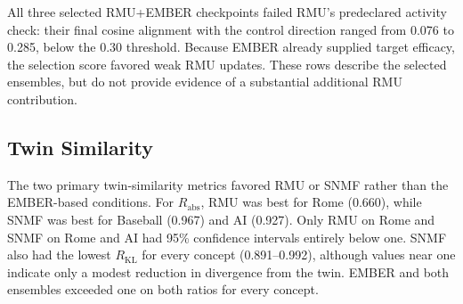 All three selected RMU+EMBER checkpoints failed RMU's predeclared activity
check: their final cosine alignment with the control direction ranged from
0.076 to 0.285, below the 0.30 threshold. Because EMBER already supplied
target efficacy, the selection score favored weak RMU updates. These rows
describe the selected ensembles, but do not provide evidence of a substantial
additional RMU contribution.

\subsection{Twin Similarity}

The two primary twin-similarity metrics favored RMU or SNMF rather than the
EMBER-based conditions. For $R_{\mathrm{abs}}$, RMU was best for Rome (0.660),
while SNMF was best for Baseball (0.967) and AI (0.927). Only RMU on Rome and
SNMF on Rome and AI had 95\% confidence intervals entirely below one. SNMF
also had the lowest $R_{\mathrm{KL}}$ for every concept (0.891--0.992), although
values near one indicate only a modest reduction in divergence from the twin.
EMBER and both ensembles exceeded one on both ratios for every concept.

